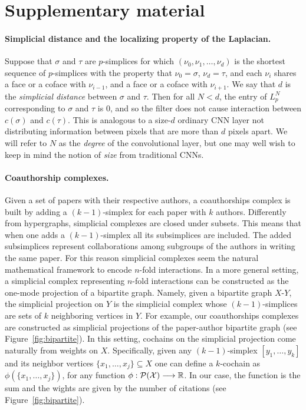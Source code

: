 \section{Supplementary material}\label{sec:supp_material}

\paragraph{Simplicial distance and the localizing property of the Laplacian.}
Suppose that $\sigma$ and $\tau$ are $p$-simplices for which $(\nu_0, \nu_1, \dotsc, \nu_d)$ is the shortest sequence of $p$-simplices with the property that $\nu_0=\sigma$, $\nu_d=\tau$, and each $\nu_i$ shares a face or a coface with $\nu_{i-1}$, and a face or a coface with $\nu_{i+1}$. We say that $d$ is the \emph{simplicial distance} between $\sigma$ and $\tau$. Then for all $N<d$, the entry of $L_p^N$ corresponding to $\sigma$ and $\tau$ is $0$, and so the filter does not cause interaction between $c(\sigma)$ and $c(\tau)$. This is analogous to a size-$d$ ordinary CNN layer not distributing information between pixels that are more than $d$ pixels apart. We will refer to $N$ as the \emph{degree} of the convolutional layer, but one may well wish to keep in mind the notion of \emph{size} from traditional CNNs.

\paragraph{Coauthorship complexes.}
Given a set of papers with their respective authors, a coauthorships complex is built by adding a $(k-1)$-simplex for each paper with $k$ authors. Differently from hypergraphs, simplicial complexes are closed under subsets. This means that when one adds a $(k-1)$-simplex all its subsimplices are included. The added subsimplices represent collaborations among subgroups of the authors in writing the same paper. For this reason simplicial complexes seem the natural mathematical framework to encode $n$-fold interactions. In a more general setting, a simplicial complex representing $n$-fold interactions can be constructed as the one-mode projection of a bipartite graph. Namely, given a bipartite graph $X$-$Y$, the simplicial projection on $Y$ is the simplicial complex whose $(k-1)$-simplices are sets of $k$ neighboring vertices in $Y$. For example, our coauthorships complexes are constructed as simplicial projections of the paper-author bipartite graph (see Figure~\ref{fig:bipartite}). In this setting, cochains on the simplicial projection come naturally from weights on $X$. Specifically, given any $(k-1)$-simplex $[y_1,\dots,y_k]$ and its neighbor vertices $\{x_1,\dots,x_j\}\subseteq X$ one can define a $k$-cochain as $\phi(\{x_1,\dots,x_j\})$, for any function $\phi: \mathcal{P(X)}\longrightarrow \mathbb{R} $. In our case, the function is the sum and the wights are given by the number of citations (see Figure~\ref{fig:bipartite}).

